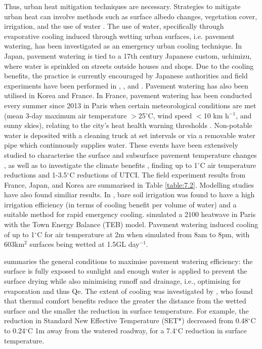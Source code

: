 \documentclass[final,3p,times,authoryear]{elsarticle}
\begin{document}
Thus, urban heat mitigation techniques are necessary. Strategies to mitigate urban heat can involve methods such as surface albedo changes, vegetation cover, irrigation, and the use of water \citep{Krayenhoff2021}. The use of water, specifically through evaporative cooling induced through wetting urban surfaces, i.e. pavement watering, has been investigated as an emergency urban cooling technique. In Japan, pavement watering is tied to a 17th century Japanese custom, uchimizu, where water is sprinkled on streets outside houses and shops. Due to the cooling benefits, the practice is currently encouraged by Japanese authorities \citep{Solcerova2018} and field experiments have been performed in \cite{Kinouchi1997}, \cite{Himeno2010}, and \cite{Takebayashi2021}. Pavement watering has also been utilised in Korea \citep{Kim2014a,Kim2015,Na2021} and France. In France, pavement watering has been conducted every summer since 2013 in Paris when certain meteorological conditions are met (mean 3-day maximum air temperature $>$25$^{\circ}$C, wind speed $<$10 km h$^{-1}$, and sunny skies), relating to the city's heat health warning thresholds \citep{Pascal2006}. Non-potable water is deposited with a cleaning truck at set intervals or via a removable water pipe which continuously supplies water. These events have been extensively studied to characterise the surface and subsurface pavement temperature changes \citep{Hendel2015,Hendel2015a,Hendel2015b,Hendel2014}, as well as to investigate the climate benefits \citep{Hendel2016,Parison2020}, finding up to 1$^{\circ}$C air temperature reductions and 1-3.5$^{\circ}$C reductions of UTCI. The field experiment results from France, Japan, and Korea are summarised in Table \ref{table:7.2}. Modelling studies have also found similiar results. In \cite{Broadbent2018b}, bare soil irrigation was found to have a high irrigation efficiency (in terms of cooling benefit per volume of water) and a suitable method for rapid emergency cooling. \cite{Daniel2018} simulated a 2100 heatwave in Paris with the Town Energy Balance (TEB) model. Pavement watering induced cooling of up to 1$^{\circ}$C for air temperature at 2m when simulated from 8am to 8pm, with 603km$^{2}$ surfaces being wetted at 1.5GL day$^{-1}$. 

\cite{Hendel2020} summaries the general conditions to maximise pavement watering efficiency: the surface is fully exposed to sunlight and enough water is applied to prevent the surface drying while also minimising runoff and drainage, i.e., optimising for evaporation and thus \gls{Qe}. The extent of cooling was investigated by \cite{Takebayashi2021}, who found that thermal comfort benefits reduce the greater the distance from the wetted surface and the smaller the reduction in surface temperature. For example, the reduction in Standard New Effective Temperature (SET*) decreased from 0.48$^{\circ}$C to 0.24$^{\circ}$C 1m away from the watered roadway, for a 7.4$^{\circ}$C reduction in surface temperature. 
\end{document}
